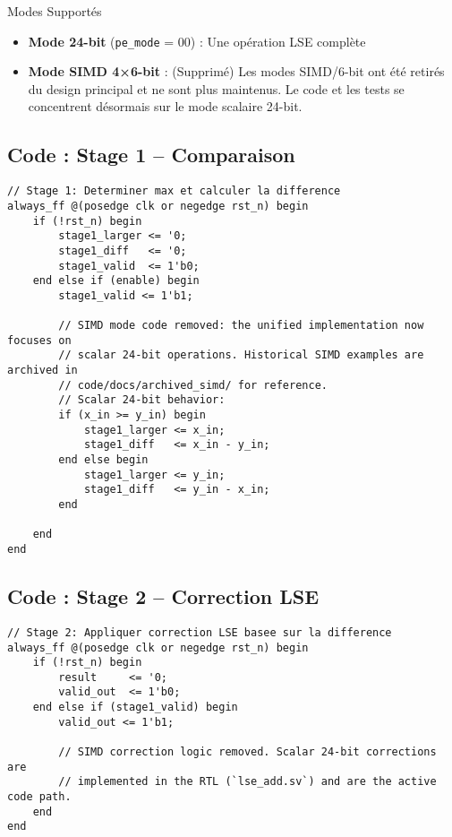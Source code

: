 \documentclass[12pt,a4paper]{article}
\newcommand{\signal}[1]{\texttt{#1}}
\begin{document}
\begin{notebox}{Modes Supportés}
\begin{itemize}
    \item \textbf{Mode 24-bit} (\signal{pe\_mode} = 00) : Une opération LSE complète
    \item \textbf{Mode SIMD 4×6-bit} : (Supprimé) Les modes SIMD/6-bit ont été retirés du design principal
          et ne sont plus maintenus. Le code et les tests se concentrent désormais sur le mode scalaire 24-bit.
\end{itemize}
\end{notebox}

\subsection{Code : Stage 1 -- Comparaison}

\begin{lstlisting}[style=verilog, caption={Stage 1 : Calcul du maximum et de la différence}]
// Stage 1: Determiner max et calculer la difference
always_ff @(posedge clk or negedge rst_n) begin
    if (!rst_n) begin
        stage1_larger <= '0;
        stage1_diff   <= '0;
        stage1_valid  <= 1'b0;
    end else if (enable) begin
        stage1_valid <= 1'b1;
        
        // SIMD mode code removed: the unified implementation now focuses on
        // scalar 24-bit operations. Historical SIMD examples are archived in
        // code/docs/archived_simd/ for reference.
        // Scalar 24-bit behavior:
        if (x_in >= y_in) begin
            stage1_larger <= x_in;
            stage1_diff   <= x_in - y_in;
        end else begin
            stage1_larger <= y_in;
            stage1_diff   <= y_in - x_in;
        end
        
    end
end
\end{lstlisting}

\subsection{Code : Stage 2 -- Correction LSE}

\begin{lstlisting}[style=verilog, caption={Stage 2 : Application de la correction logarithmique}]
// Stage 2: Appliquer correction LSE basee sur la difference
always_ff @(posedge clk or negedge rst_n) begin
    if (!rst_n) begin
        result     <= '0;
        valid_out  <= 1'b0;
    end else if (stage1_valid) begin
        valid_out <= 1'b1;
        
        // SIMD correction logic removed. Scalar 24-bit corrections are
        // implemented in the RTL (`lse_add.sv`) and are the active code path.
    end
end
\end{lstlisting}
\end{document}
